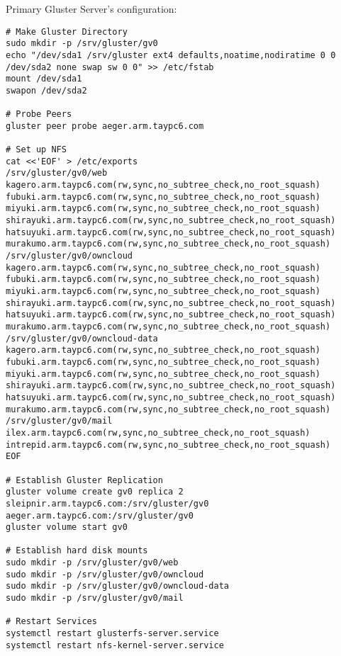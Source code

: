 \documentclass[12pt]{spieman}  %
\begin{document}
Primary Gluster Server's configuration:
\begin{lstlisting}
# Make Gluster Directory
sudo mkdir -p /srv/gluster/gv0
echo "/dev/sda1 /srv/gluster ext4 defaults,noatime,nodiratime 0 0
/dev/sda2 none swap sw 0 0" >> /etc/fstab
mount /dev/sda1
swapon /dev/sda2

# Probe Peers
gluster peer probe aeger.arm.taypc6.com

# Set up NFS
cat <<'EOF' > /etc/exports
/srv/gluster/gv0/web kagero.arm.taypc6.com(rw,sync,no_subtree_check,no_root_squash) fubuki.arm.taypc6.com(rw,sync,no_subtree_check,no_root_squash) miyuki.arm.taypc6.com(rw,sync,no_subtree_check,no_root_squash) shirayuki.arm.taypc6.com(rw,sync,no_subtree_check,no_root_squash) hatsuyuki.arm.taypc6.com(rw,sync,no_subtree_check,no_root_squash) murakumo.arm.taypc6.com(rw,sync,no_subtree_check,no_root_squash)
/srv/gluster/gv0/owncloud kagero.arm.taypc6.com(rw,sync,no_subtree_check,no_root_squash) fubuki.arm.taypc6.com(rw,sync,no_subtree_check,no_root_squash) miyuki.arm.taypc6.com(rw,sync,no_subtree_check,no_root_squash) shirayuki.arm.taypc6.com(rw,sync,no_subtree_check,no_root_squash) hatsuyuki.arm.taypc6.com(rw,sync,no_subtree_check,no_root_squash) murakumo.arm.taypc6.com(rw,sync,no_subtree_check,no_root_squash)
/srv/gluster/gv0/owncloud-data kagero.arm.taypc6.com(rw,sync,no_subtree_check,no_root_squash) fubuki.arm.taypc6.com(rw,sync,no_subtree_check,no_root_squash) miyuki.arm.taypc6.com(rw,sync,no_subtree_check,no_root_squash) shirayuki.arm.taypc6.com(rw,sync,no_subtree_check,no_root_squash) hatsuyuki.arm.taypc6.com(rw,sync,no_subtree_check,no_root_squash) murakumo.arm.taypc6.com(rw,sync,no_subtree_check,no_root_squash)
/srv/gluster/gv0/mail ilex.arm.taypc6.com(rw,sync,no_subtree_check,no_root_squash) intrepid.arm.taypc6.com(rw,sync,no_subtree_check,no_root_squash)
EOF

# Establish Gluster Replication
gluster volume create gv0 replica 2 sleipnir.arm.taypc6.com:/srv/gluster/gv0 aeger.arm.taypc6.com:/srv/gluster/gv0
gluster volume start gv0

# Establish hard disk mounts
sudo mkdir -p /srv/gluster/gv0/web
sudo mkdir -p /srv/gluster/gv0/owncloud
sudo mkdir -p /srv/gluster/gv0/owncloud-data
sudo mkdir -p /srv/gluster/gv0/mail

# Restart Services
systemctl restart glusterfs-server.service
systemctl restart nfs-kernel-server.service
\end{lstlisting}
\end{document}
